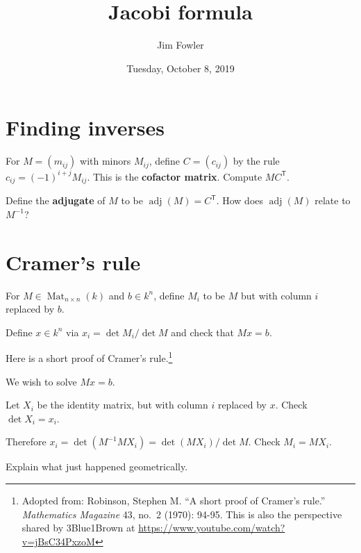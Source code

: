 \documentclass{homework}
\author{Jim Fowler}
\title{Jacobi formula}
\date{Tuesday, October 8, 2019}
\DeclareMathOperator{\Mat}{Mat}
\DeclareMathOperator{\adj}{adj}
\begin{document}
\maketitle

\section{Finding inverses}

\begin{problem}
  For $M = (m_{ij})$ with minors $M_{ij}$, define $C = (c_{ij})$ by
  the rule $c_{ij} = (-1)^{i+j} M_{ij}$.  This is the \textbf{cofactor
    matrix}.  Compute $MC^{\textsf{T}}$.
\end{problem}

\begin{problem}
  Define the \textbf{adjugate} of $M$ to be $\adj(M) = C^{\textsf{T}}$.
    How does $\adj(M)$ relate to $M^{-1}$?
\end{problem}

\vfill

\section{Cramer's rule}

\begin{problem}
  For $M \in \Mat_{n \times n}(k)$ and $b \in k^n$, define $M_i$ to be
  $M$ but with column $i$ replaced by $b$.

  Define $x \in k^n$ via $x_i = \det M_i / \det M$ and check that
  $Mx = b$.
\end{problem}

\begin{problem}
  Here is a short proof of Cramer's rule.\footnote{Adopted from: Robinson, Stephen M. ``A short proof of Cramer's rule.'' \textit{Mathematics Magazine} 43, no.~2 (1970): 94-95.  This is also the perspective shared by 3Blue1Brown at \url{https://www.youtube.com/watch?v=jBsC34PxzoM}}

  We wish to solve $Mx = b$.
  
  Let $X_i$ be the identity matrix, but with column $i$ replaced by $x$.  Check $\det X_i = x_i$.
\end{problem}

\begin{problem}
  Therefore $x_i = \det (M^{-1} M X_i) = \det (MX_i) / \det M$.  Check $M_i = MX_i$.
\end{problem}

\begin{problem}
  Explain what just happened geometrically.
\end{problem}
\end{document}
